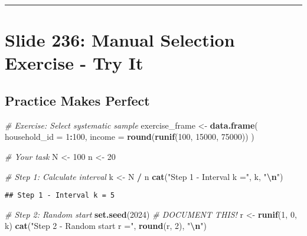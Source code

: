 \documentclass[
]{article}
\newenvironment{Shaded}{\begin{snugshade}}{\end{snugshade}}
\newcommand{\AttributeTok}[1]{\textcolor[rgb]{0.13,0.29,0.53}{#1}}
\newcommand{\CommentTok}[1]{\textcolor[rgb]{0.56,0.35,0.01}{\textit{#1}}}
\newcommand{\DecValTok}[1]{\textcolor[rgb]{0.00,0.00,0.81}{#1}}
\newcommand{\FunctionTok}[1]{\textcolor[rgb]{0.13,0.29,0.53}{\textbf{#1}}}
\newcommand{\NormalTok}[1]{#1}
\newcommand{\OtherTok}[1]{\textcolor[rgb]{0.56,0.35,0.01}{#1}}
\newcommand{\SpecialCharTok}[1]{\textcolor[rgb]{0.81,0.36,0.00}{\textbf{#1}}}
\newcommand{\StringTok}[1]{\textcolor[rgb]{0.31,0.60,0.02}{#1}}
\begin{document}
\begin{center}\rule{0.5\linewidth}{0.5pt}\end{center}

\section{Slide 236: Manual Selection Exercise - Try
It}\label{slide-236-manual-selection-exercise---try-it}

\subsection{Practice Makes Perfect}\label{practice-makes-perfect}

\begin{Shaded}
\begin{Highlighting}[]
\CommentTok{\# Exercise: Select systematic sample}
\NormalTok{exercise\_frame }\OtherTok{\textless{}{-}} \FunctionTok{data.frame}\NormalTok{(}
  \AttributeTok{household\_id =} \DecValTok{1}\SpecialCharTok{:}\DecValTok{100}\NormalTok{,}
  \AttributeTok{income =} \FunctionTok{round}\NormalTok{(}\FunctionTok{runif}\NormalTok{(}\DecValTok{100}\NormalTok{, }\DecValTok{15000}\NormalTok{, }\DecValTok{75000}\NormalTok{))}
\NormalTok{)}

\CommentTok{\# Your task}
\NormalTok{N }\OtherTok{\textless{}{-}} \DecValTok{100}
\NormalTok{n }\OtherTok{\textless{}{-}} \DecValTok{20}

\CommentTok{\# Step 1: Calculate interval}
\NormalTok{k }\OtherTok{\textless{}{-}}\NormalTok{ N }\SpecialCharTok{/}\NormalTok{ n}
\FunctionTok{cat}\NormalTok{(}\StringTok{"Step 1 {-} Interval k ="}\NormalTok{, k, }\StringTok{"}\SpecialCharTok{\textbackslash{}n}\StringTok{"}\NormalTok{)}
\end{Highlighting}
\end{Shaded}

\begin{verbatim}
## Step 1 - Interval k = 5
\end{verbatim}

\begin{Shaded}
\begin{Highlighting}[]
\CommentTok{\# Step 2: Random start}
\FunctionTok{set.seed}\NormalTok{(}\DecValTok{2024}\NormalTok{)  }\CommentTok{\# DOCUMENT THIS!}
\NormalTok{r }\OtherTok{\textless{}{-}} \FunctionTok{runif}\NormalTok{(}\DecValTok{1}\NormalTok{, }\DecValTok{0}\NormalTok{, k)}
\FunctionTok{cat}\NormalTok{(}\StringTok{"Step 2 {-} Random start r ="}\NormalTok{, }\FunctionTok{round}\NormalTok{(r, }\DecValTok{2}\NormalTok{), }\StringTok{"}\SpecialCharTok{\textbackslash{}n}\StringTok{"}\NormalTok{)}
\end{Highlighting}
\end{Shaded}
\end{document}
